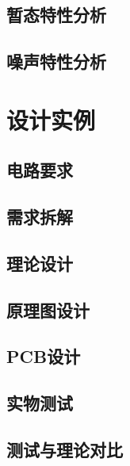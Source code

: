 \documentclass[UTF8]{ctexart}
\numberwithin{equation}{section} %
\numberwithin{figure}{section}
\begin{document}
\subsection{暂态特性分析}

\subsection{噪声特性分析}

\section{设计实例}
\subsection{电路要求}

\subsection{需求拆解}

\subsection{理论设计}

\subsection{原理图设计}

\subsection{PCB设计}

\subsection{实物测试}

\subsection{测试与理论对比}
\end{document}
